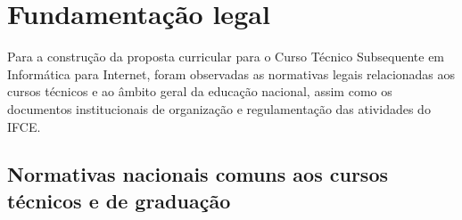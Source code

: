 \documentclass[
	12pt,				%
	openright,			%
	twoside,			%
	a4paper,			%
	chapter=TITLE,		%
	english,			%
	french,				%
	spanish,			%
	brazil,				%
	]{abntex2}
\begin{document}


\pagestyle{abntheadings}


\textual


\normalsize


	

\chapter{Fundamentação legal}
Para a construção da proposta curricular para o Curso Técnico Subsequente em Informática para Internet, foram observadas as normativas legais relacionadas aos cursos técnicos e ao âmbito geral da educação nacional, assim como os documentos institucionais de organização e regulamentação das atividades do IFCE.

\section{Normativas nacionais comuns aos cursos técnicos e de graduação}
\end{document}
